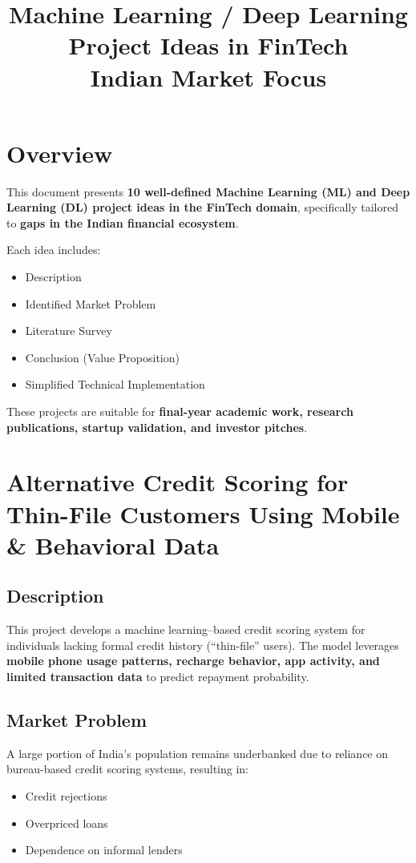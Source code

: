 \documentclass[11pt,a4paper]{article}
\title{\textbf{Machine Learning / Deep Learning Project Ideas in FinTech}\\
\large Indian Market Focus}
\author{}
\date{}
\begin{document}
\maketitle

\section*{Overview}

This document presents \textbf{10 well-defined Machine Learning (ML) and Deep Learning (DL) project ideas in the FinTech domain}, specifically tailored to \textbf{gaps in the Indian financial ecosystem}.

Each idea includes:
\begin{itemize}[noitemsep]
    \item Description
    \item Identified Market Problem
    \item Literature Survey
    \item Conclusion (Value Proposition)
    \item Simplified Technical Implementation
\end{itemize}

These projects are suitable for \textbf{final-year academic work, research publications, startup validation, and investor pitches}.

\section{Alternative Credit Scoring for Thin-File Customers Using Mobile \& Behavioral Data}

\subsection*{Description}
This project develops a machine learning–based credit scoring system for individuals lacking formal credit history (``thin-file'' users).  
The model leverages \textbf{mobile phone usage patterns, recharge behavior, app activity, and limited transaction data} to predict repayment probability.

\subsection*{Market Problem}
A large portion of India’s population remains underbanked due to reliance on bureau-based credit scoring systems, resulting in:
\begin{itemize}[noitemsep]
    \item Credit rejections
    \item Overpriced loans
    \item Dependence on informal lenders
\end{itemize}
\end{document}
